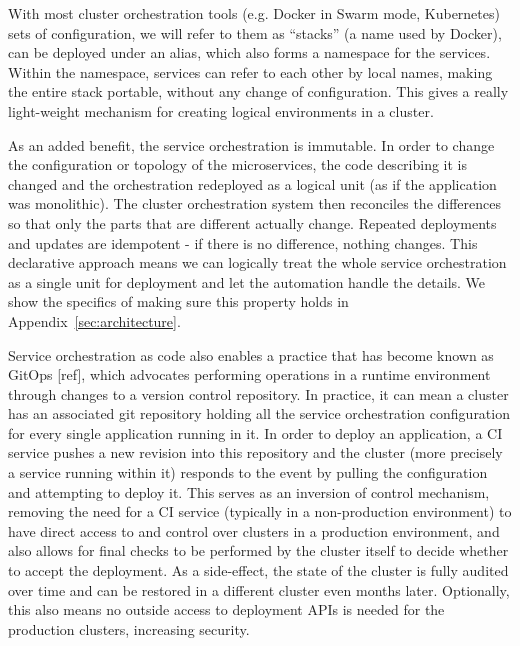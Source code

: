 \documentclass[reprint,amsmath,amssymb,aps]{revtex4-1}
\begin{document}
With most cluster orchestration tools (e.g. Docker in Swarm mode, Kubernetes) sets of configuration, we will refer to them as “stacks” (a name used by Docker), can be deployed under an alias, which also forms a namespace for the services. Within the namespace, services can refer to each other by local names, making the entire stack portable, without any change of configuration. This gives a really light-weight mechanism for creating logical environments in a cluster.

As an added benefit, the service orchestration is immutable. In order to change the configuration or topology of the microservices, the code describing it is changed and the orchestration redeployed as a logical unit (as if the application was monolithic). The cluster orchestration system then reconciles the differences so that only the parts that are different actually change. Repeated deployments and updates are idempotent - if there is no difference, nothing changes. This declarative approach means we can logically treat the whole service orchestration as a single unit for deployment and let the automation handle the details. We show the specifics of making sure this property holds in Appendix~\ref{sec:architecture}.

Service orchestration as code also enables a practice that has become known as GitOps [ref], which advocates performing operations in a runtime environment through changes to a version control repository. In practice, it can mean a cluster has an associated git repository holding all the service orchestration configuration for every single application running in it. In order to deploy an application, a CI service pushes a new revision into this repository and the cluster (more precisely a service running within it) responds to the event by pulling the configuration and attempting to deploy it. This serves as an inversion of control mechanism, removing the need for a CI service (typically in a non-production environment) to have direct access to and control over clusters in a production environment, and also allows for final checks to be performed by the cluster itself to decide whether to accept the deployment. As a side-effect, the state of the cluster is fully audited over time and can be restored in a different cluster even months later. Optionally, this also means no outside access to deployment APIs is needed for the production clusters, increasing security.
\end{document}
